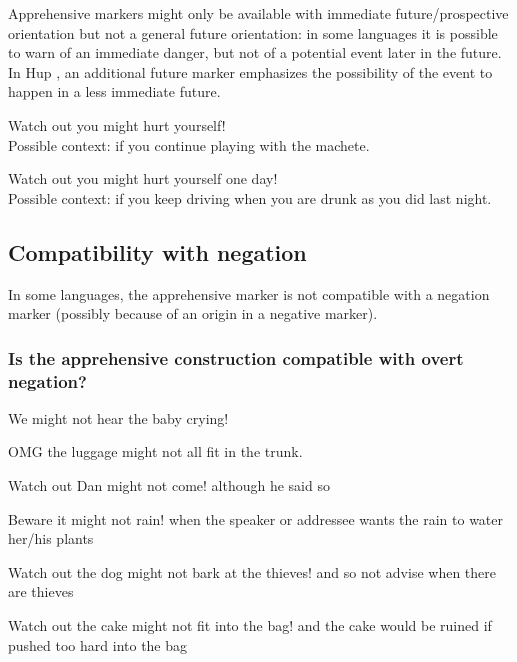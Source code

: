 \documentclass[output=paper,colorlinks,citecolor=brown]{langscibook}
\begin{document}
Apprehensive markers might only be available with immediate future/prospective orientation but not a general future orientation: in some languages it is possible to warn of an immediate danger, but not of a potential event later in the future. In Hup \citep[609]{epps2008}, an additional future marker emphasizes the possibility of the event to happen in a less immediate future.

\ea \label{p26} {\op}Watch out{\cp} you might hurt yourself! \\
\textnormal{Possible context: if you continue playing with the machete.}
\z

\ea \label{p27} {\op}Watch out{\cp} you might hurt yourself one day! \\
\textnormal{Possible context: if you keep driving when you are drunk as you did last night.}
\z

\subsection{Compatibility with negation}
\label{subsec:apprnegation}

In some languages, the apprehensive marker is not compatible with a negation marker (possibly because of an origin in a negative marker).

\subsubsection{Is the apprehensive construction compatible with overt negation?}
\label{1.7.1}

\ea \label{p28} We might not hear the baby crying!
\z

\ea \label{p29} {\op}OMG{\cp} the luggage might not all fit in the trunk.
\z

\ea \label{p30} {\op}Watch out{\cp} Dan might not come! {\op}\textnormal{although he said so}{\cp}
\z

\ea \label{p31} {\op}Beware{\cp} it might not rain! {\op}\textnormal{when the speaker or addressee wants the rain to water her/his plants}{\cp}
\z

\ea \label{p32} {\op}Watch out{\cp} the dog might not bark at the thieves! {\op}\textnormal{and so not advise when there are thieves}{\cp}
\z

\ea \label{p33} {\op}Watch out{\cp} the cake might not fit into the bag! {\op}\textnormal{and the cake would be ruined if pushed too hard into the bag}{\cp}
\z
\end{document}
